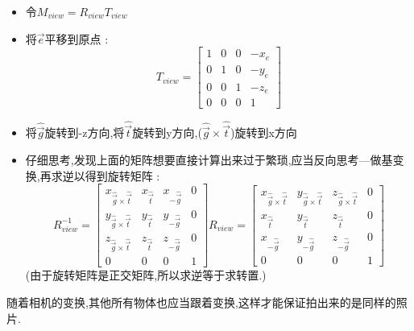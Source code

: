 {{{\begin{itemize}
{              \begin{itemize}
                \item 令$M_{view} = R_{view}T_{view}$
                \item 将$\vec{e}$平移到原点 : $$
                        T_{view} = \begin{bmatrix}
                          1 & 0 & 0 & -x_e \\
                          0 & 1 & 0 & -y_e \\
                          0 & 0 & 1 & -z_e \\
                          0 & 0 & 0 & 1
                        \end{bmatrix}
                      $$
                \item 将$\hat{\vec{g}}$旋转到-z方向,将$\hat{\vec{t}}$旋转到y方向,($\hat{\vec{g}} \times \hat{\vec{t}}$)旋转到x方向
                \item 仔细思考,发现上面的矩阵想要直接计算出来过于繁琐,应当反向思考—做基变换,再求逆以得到旋转矩阵 : $$
                        R^{-1}_{view} = \begin{bmatrix}
                          x_{\hat{\vec{g}} \times \hat{\vec{t}}} & x_{\hat{\vec{t}}} & x_{-\hat{\vec{g}}} & 0 \\
                          y_{\hat{\vec{g}} \times \hat{\vec{t}}} & y_{\hat{\vec{t}}} & y_{-\hat{\vec{g}}} & 0 \\
                          z_{\hat{\vec{g}} \times \hat{\vec{t}}} & z_{\hat{\vec{t}}} & z_{-\hat{\vec{g}}} & 0 \\
                          0                                      & 0                 & 0                  & 1
                        \end{bmatrix}
                        R_{view} = \begin{bmatrix}
                          x_{\hat{\vec{g}} \times \hat{\vec{t}}} & y_{\hat{\vec{g}} \times \hat{\vec{t}}} & z_{\hat{\vec{g}} \times \hat{\vec{t}}} & 0 \\
                          x_{\hat{\vec{t}}}                      & y_{\hat{\vec{t}}}                      & z_{\hat{\vec{t}}}                      & 0 \\
                          x_{-\hat{\vec{g}}}                     & y_{-\hat{\vec{g}}}                     & z_{-\hat{\vec{g}}}                     & 0 \\
                          0                                      & 0                                      & 0                                      & 1
                        \end{bmatrix}
                      $$
                      (由于旋转矩阵是正交矩阵,所以求逆等于求转置.)
              \end{itemize}
              随着相机的变换,其他所有物体也应当跟着变换,这样才能保证拍出来的是同样的照片.
              }


\end{itemize}}}}
